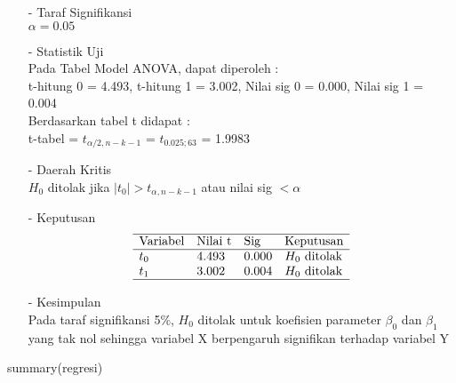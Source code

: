 \begin{enumerate}
\begin{test}
{\begin{enumerate}
    \item[-] Taraf Signifikansi \\
    $\alpha = 0.05$

    \item[-] Statistik Uji \\
    Pada Tabel Model ANOVA, dapat diperoleh : \\
    t-hitung 0 = 4.493, t-hitung 1 = 3.002, Nilai sig 0 = 0.000, Nilai sig 1 = 0.004 \\
    Berdasarkan tabel t didapat : \\
    t-tabel = $t_{\alpha/2, n-k-1}$ = $t_{0.025; 63}$ = 1.9983

    \item[-] Daerah Kritis \\
    $H_0$ ditolak jika $|t_0| > t_{\alpha, n-k-1}$ atau nilai sig $< \alpha$

    \item[-] Keputusan \\
    $$\begin{array}{lllll}
        \hline 
        \text{Variabel} & \text{Nilai t} & \text{Sig} & \text{Keputusan}  \\
        \hline 
        t_0 & 4.493 & 0.000 & H_0 \text{ ditolak} \\
        t_1 & 3.002 & 0.004 & H_0 \text{ ditolak} \\
        \hline
    \end{array}$$

    \item[-] Kesimpulan \\
    Pada taraf signifikansi 5\%, $H_0$ ditolak untuk koefisien parameter $\beta_0$ dan $\beta_1$ yang tak nol sehingga variabel X berpengaruh signifikan terhadap variabel Y
\end{enumerate}
}
summary(regresi)
\end{test}


\end{enumerate}
